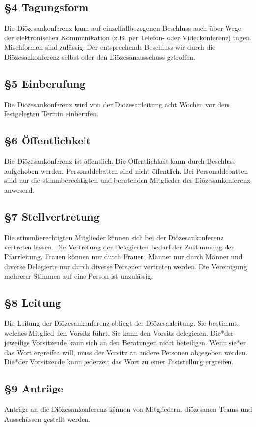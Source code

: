 \documentclass[12pt]{report}
\begin{document}
\begin{justify}
\subsection*{§4 Tagungsform}
Die Diözesankonferenz kann auf einzelfallbezogenen Beschluss auch über Wege der elektronischen Kommunikation (z.B. per Telefon- oder Videokonferenz) tagen. Mischformen sind zulässig. Der entsprechende Beschluss wir durch die
Diözesankonferenz selbst oder den Diözesanausschuss getroffen.
\subsection*{§5 Einberufung}
Die Diözesankonferenz wird von der Diözesanleitung acht Wochen vor dem festgelegten Termin einberufen.
\subsection*{§6 Öffentlichkeit}
Die Diözesankonferenz ist öffentlich. Die Öffentlichkeit kann durch Beschluss aufgehoben werden.
Personaldebatten sind nicht öffentlich. Bei Personaldebatten sind nur die stimmberechtigten und beratenden
Mitglieder der Diözesankonferenz anwesend.
\subsection*{§7 Stellvertretung}
Die stimmberechtigten Mitglieder können sich bei der Diözesankonferenz vertreten lassen. Die Vertretung
der Delegierten bedarf der Zustimmung der Pfarrleitung. Frauen können nur durch Frauen, Männer nur durch
Männer und diverse Delegierte nur durch diverse Personen vertreten werden. Die Vereinigung mehrerer Stimmen auf eine Person ist unzulässig.
\subsection*{§8 Leitung}
Die Leitung der Diözesankonferenz obliegt der Diözesanleitung. Sie bestimmt, welches Mitglied den Vorsitz
führt. Sie kann den Vorsitz delegieren. Die*der jeweilige Vorsitzende kann sich an den Beratungen nicht beteiligen.
Wenn sie*er das Wort ergreifen will, muss der Vorsitz an andere Personen abgegeben werden.
Die*der Vorsitzende kann jederzeit das Wort zu einer Feststellung ergreifen.
\subsection*{§9 Anträge}
Anträge an die Diözesankonferenz können von Mitgliedern, diözesanen Teams und Ausschüssen gestellt werden.


\end{justify}
\end{document}
